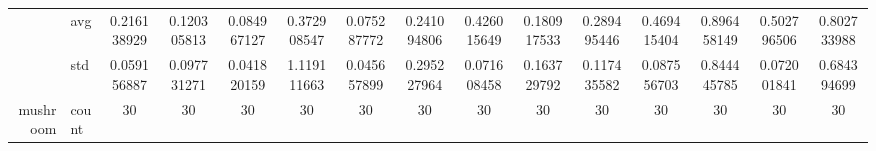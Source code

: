 \begin{table}[htbp]
{\begin{tabular}{rlccc|c|c|c|c|c|ccccc}
			                                                                               & avg                & \cellcolor[rgb]{ .788,  .859,  .502}0.216138929                                & \cellcolor[rgb]{ .514,  .78,  .486}0.120305813                                 & \cellcolor[rgb]{ .416,  .753,  .482}0.084967127                                & \cellcolor[rgb]{ 1,  .855,  .506}0.372908547    & \cellcolor[rgb]{ .388,  .745,  .482}\textcolor[rgb]{ 0,  .38,  0}{0.075287772} & \cellcolor[rgb]{ .859,  .878,  .506}0.241094806 & \cellcolor[rgb]{ .996,  .808,  .498}0.426015649                                & \cellcolor[rgb]{ .686,  .831,  .498}0.180917533 & \cellcolor[rgb]{ 1,  .922,  .518}0.289495446    & \cellcolor[rgb]{ .992,  .773,  .49}0.469415404  & \cellcolor[rgb]{ .973,  .412,  .42}0.896458149  & \cellcolor[rgb]{ .992,  .745,  .486}0.502796506 & \cellcolor[rgb]{ .98,  .494,  .435}0.802733988  \\
			                                                                               & std                & 0.059156887                                                                    & 0.097731271                                                                    & 0.041820159                                                                    & 1.119111663                                     & 0.045657899                                                                    & 0.295227964                                     & 0.071608458                                                                    & 0.163729792                                     & 0.117435582                                     & 0.087556703                                     & 0.844445785                                     & 0.072001841                                     & 0.684394699                                     \\
			mushroom                                                                       & count              & 30                                                                             & 30                                                                             & 30                                                                             & 30                                              & 30                                                                             & 30                                              & 30                                                                             & 30                                              & 30                                              & 30                                              & 30                                              & 30                                              & 30                                              \\

\end{tabular}}
\end{table}
